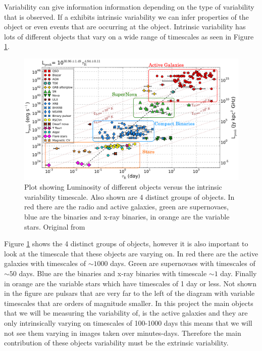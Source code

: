 \documentclass[10pt,a4paper]{article}
\begin{document}
Variability can give information information depending on the type of variability that is observed. If a  exhibits intrinsic variability we can infer properties of the object or even events that are occurring at the object. Intrinsic variability has lots of different objects that vary on a wide range of timescales as seen in Figure \ref{intrinsic}.
\begin{figure}[H]
\begin{center}
	\includegraphics[width=\textwidth]{intrin3}
	\caption{Plot showing Luminosity of different objects versus the intrinsic variability timescale. Also shown are 4 distinct groups of objects. In red there are the radio and active galaxies, green are supernovaes, blue are the binaries and x-ray binaries, in orange are the variable stars. Original from \citet{Pietka}}
	\label{intrinsic}
\end{center}
\end{figure}
Figure \ref{intrinsic} shows the 4 distinct groups of objects, however it is also important to look at the timescale that these objects are varying on. In red there are the active galaxies with timescales of $\sim 1000$ days. Green are supernovaes with timescales of  $\sim 50$ days. Blue are the binaries and x-ray binaries with timescale  $\sim 1$ day. Finally in orange are the variable stars which have timescales of 1 day or less. Not shown in the figure are pulsars that are very far to the left of the diagram with variable timescales that are orders of magnitude smaller. In this project the main objects that we will be measuring the variability of, is the active galaxies and they are only intrinsically varying on timescales of 100-1000 days this means that we will not see them varying in images taken over minutes-days. Therefore the main contribution of these objects variability must be the extrinsic variability.\\
\end{document}
